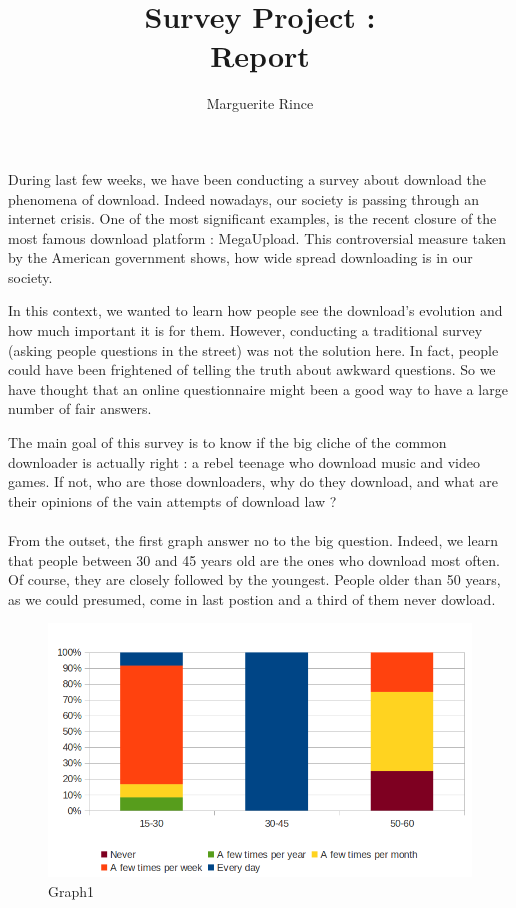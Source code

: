 \documentclass[a4paper]{article}
\title{Survey Project :\\Report}
\author{Marguerite Rince}
\begin{document}
\maketitle
\paragraph{}
During last few weeks, we have been conducting a survey about download the phenomena of download. Indeed nowadays, our society is passing through an internet crisis. One of the most significant  examples, is the recent closure of the most famous download platform : MegaUpload. This controversial measure taken by the American government shows, how wide spread downloading is in our society. 

In this context, we wanted to learn how people see the download's evolution and how much important it is for them. However, conducting a traditional survey (asking people questions in the street) was not the solution here. In fact, people could have been frightened of telling the truth about awkward questions. So we have thought that an online questionnaire might been a good way to have a large number of fair answers.

The main goal of this survey is to know if the big cliche of the common downloader is actually right : a rebel teenage who download music and video games. If not, who are those downloaders, why do they download, and what are their opinions of the vain attempts of download law ?


\clearpage
\paragraph{}
From the outset, the first graph answer no to the big question. Indeed, we learn that people between  30 and 45 years old are the ones who download most often. Of course, they are closely followed by the youngest. People older than 50 years, as we could presumed, come in last postion and a third of them never dowload.
\begin{figure}[htbp]
  \centering
  \includegraphics[scale=0.40]{graph1}
  \caption{Graph1}
  \label{fig:Graph1}
\end{figure}  
\end{document}
